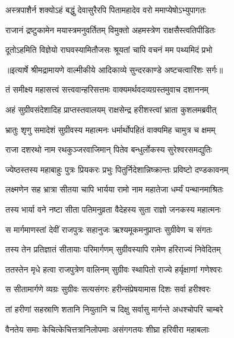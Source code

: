 \twolineshloka
{अस्त्रपाशैर्न शक्योऽहं बद्धुं देवासुरैरपि}
{पितामहादेव वरो ममाप्येषोऽभ्युपागतः} %

\twolineshloka
{राजानं द्रष्टुकामेन मयास्त्रमनुवर्तितम्}
{विमुक्तो अहमस्त्रेण राक्षसैस्त्वतिपीडितः} %

\twolineshloka
{दूतोऽहमिति विज्ञेयो राघवस्यामितौजसः}
{श्रूयतां चापि वचनं मम पथ्यमिदं प्रभो} %


{॥इत्यार्षे श्रीमद्रामायणे वाल्मीकीये आदिकाव्ये सुन्दरकाण्डे अष्टचत्वारिंशः सर्गः॥}


\twolineshloka
{तं समीक्ष्य महासत्त्वं सत्त्ववान्हरिसत्तमः}
{वाक्यमर्थवदव्यग्रस्तमुवाच दशाननम्} %

\twolineshloka
{अहं सुग्रीवसंदेशादिह प्राप्तस्तवालयम्}
{राक्षसेन्द्र हरीशस्त्वां भ्राता कुशलमब्रवीत्} %

\twolineshloka
{भ्रातुः शृणु समादेशं सुग्रीवस्य महात्मनः}
{धर्मार्थोपहितं वाक्यमिह चामुत्र च क्षमम्} %

\twolineshloka
{राजा दशरथो नाम रथकुञ्जरवाजिमान्}
{पितेव बन्धुर्लोकस्य सुरेश्वरसमद्युतिः} %

\twolineshloka
{ज्येष्ठस्तस्य महाबाहुः पुत्रः प्रियकरः प्रभुः}
{पितुर्निदेशान्निष्क्रान्तः प्रविष्टो दण्डकावनम्} %

\twolineshloka
{लक्ष्मणेन सह भ्रात्रा सीतया चापि भार्यया}
{रामो नाम महातेजा धर्म्यं पन्थानमाश्रितः} %

\twolineshloka
{तस्य भार्या वने नष्टा सीता पतिमनुव्रता}
{वैदेहस्य सुता राज्ञो जनकस्य महात्मनः} %

\twolineshloka
{स मार्गमाणस्तां देवीं राजपुत्रः सहानुजः}
{ऋश्यमूकमनुप्राप्तः सुग्रीवेण च संगतः} %

\twolineshloka
{तस्य तेन प्रतिज्ञातं सीतायाः परिमार्गणम्}
{सुग्रीवस्यापि रामेण हरिराज्यं निवेदितम्} %

\twolineshloka
{ततस्तेन मृधे हत्वा राजपुत्रेण वालिनम्}
{सुग्रीवः स्थापितो राज्ये हर्यृक्षाणां गणेश्वरः} %

\twolineshloka
{स सीतामार्गणे व्यग्रः सुग्रीवः सत्यसंगरः}
{हरीन्संप्रेषयामास दिशः सर्वा हरीश्वरः} %

\twolineshloka
{तां हरीणां सहस्राणि शतानि नियुतानि च}
{दिक्षु सर्वासु मार्गन्ते अधश्चोपरि चाम्बरे} %

\twolineshloka
{वैनतेय समाः केचित्केचित्तत्रानिलोपमाः}
{असंगगतयः शीघ्रा हरिवीरा महाबलाः} %

